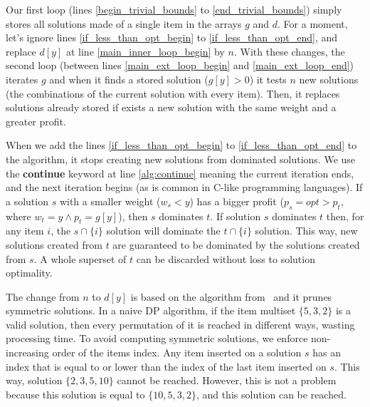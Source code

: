 \documentclass[runningheads,a4paper]{llncs}
\begin{document}
Our first loop (lines \ref{begin_trivial_bounds} to \ref{end_trivial_bounds}) simply stores all solutions made of a single item in the arrays \(g\) and \(d\). 
For a moment, let's ignore lines \ref{if_less_than_opt_begin} to \ref{if_less_than_opt_end}, and replace \(d[y]\) at line \ref{main_inner_loop_begin} by \(n\). 
With these changes, the second loop (between lines \ref{main_ext_loop_begin} and \ref{main_ext_loop_end}) 
iterates \(g\) and when it finds a stored solution (\(g[y] > 0\)) it tests \(n\) new solutions 
(the combinations of the current solution with every item). 
Then, it replaces solutions already stored if exists a new solution with the same weight and a greater profit.

When we add the lines \ref{if_less_than_opt_begin} to \ref{if_less_than_opt_end} to the algorithm, it stops creating new solutions from dominated solutions. 
We use the \textbf{continue} keyword at line \ref{alg:continue} meaning the current iteration ends, and the next iteration begins (as is common in C-like programming languages). 
If a solution \(s\) with a smaller weight (\(w_s < y\)) has a bigger profit (\(p_s = opt > p_t\), where \(w_t = y \land p_t = g[y]\)), then \(s\) dominates \(t\). 
If solution \(s\) dominates \(t\) then, for any item \(i\), the \(s \cap \{i\}\) solution will dominate the \(t \cap \{i\}\) solution. 
This way, new solutions created from \(t\) are guaranteed to be dominated by the solutions created from \(s\). 
A whole superset of \(t\) can be discarded without loss to solution optimality. 

The change from \(n\) to \(d[y]\) is based on the algorithm from~\cite{gar72} and it prunes symmetric solutions.
In a naive DP algorithm, if the item multiset \(\{5, 3, 2\}\) is a valid solution, then every permutation of it is reached in different ways, wasting processing time. 
To avoid computing symmetric solutions, we enforce non-increasing order of the items index. 
Any item inserted on a solution \(s\) has an index that is equal to or lower than the index of the last item inserted on \(s\). 
This way, solution \(\{2,3,5,10\}\) cannot be reached.
However, this is not a problem because this solution is equal to \(\{10, 5, 3, 2\}\), and this solution can be reached. 
\end{document}
